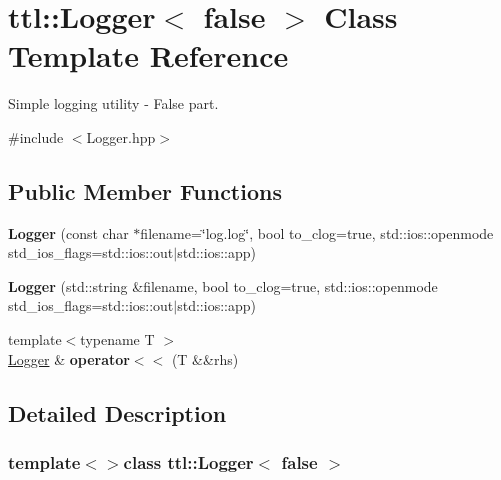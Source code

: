\hypertarget{classttl_1_1_logger_3_01false_01_4}{\section{ttl\-:\-:Logger$<$ false $>$ Class Template Reference}
\label{classttl_1_1_logger_3_01false_01_4}
}


Simple logging utility -\/ False part.  




{\ttfamily \#include $<$Logger.\-hpp$>$}

\subsection*{Public Member Functions}
\begin{DoxyCompactItemize}
\item 
\hypertarget{classttl_1_1_logger_3_01false_01_4_a51ebd004cd57d3f20c074292956909da}{{\bfseries Logger} (const char $\ast$filename=\char`\"{}log.\-log\char`\"{}, bool to\-\_\-clog=true, std\-::ios\-::openmode std\-\_\-ios\-\_\-flags=std\-::ios\-::out$|$std\-::ios\-::app)}\label{classttl_1_1_logger_3_01false_01_4_a51ebd004cd57d3f20c074292956909da}

\item 
\hypertarget{classttl_1_1_logger_3_01false_01_4_a56b1a3fa243bee87024d96f0f31bde5f}{{\bfseries Logger} (std\-::string \&filename, bool to\-\_\-clog=true, std\-::ios\-::openmode std\-\_\-ios\-\_\-flags=std\-::ios\-::out$|$std\-::ios\-::app)}\label{classttl_1_1_logger_3_01false_01_4_a56b1a3fa243bee87024d96f0f31bde5f}

\item 
\hypertarget{classttl_1_1_logger_3_01false_01_4_a1f17d7e08362e7f9a1ab661c64468362}{{\footnotesize template$<$typename T $>$ }\\\hyperlink{classttl_1_1_logger}{Logger} \& {\bfseries operator$<$$<$} (T \&\&rhs)}\label{classttl_1_1_logger_3_01false_01_4_a1f17d7e08362e7f9a1ab661c64468362}

\end{DoxyCompactItemize}


\subsection{Detailed Description}
\subsubsection*{template$<$$>$class ttl\-::\-Logger$<$ false $>$}

